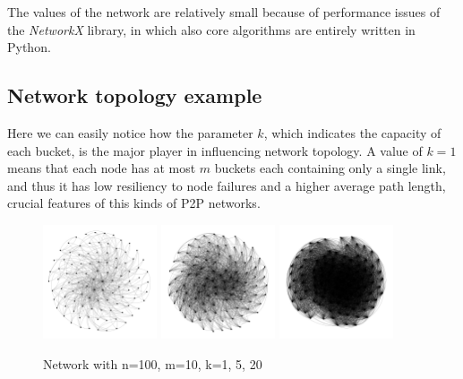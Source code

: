 \documentclass[12pt]{article}
\begin{document}
The values of the network are relatively small because of performance issues of the \textit{NetworkX} library, in which also core algorithms are entirely written in Python.

\subsection{Network topology example}

Here we can easily notice how the parameter $k$, which indicates the capacity of each bucket, is the major player in influencing network topology. A value of $k=1$ means that each node has at most $m$ buckets each containing only a single link, and thus it has low resiliency to node failures and a higher average path length, crucial features of this kinds of P2P networks.

\begin{figure}[H]
    \centering
    \includegraphics[width=0.3\textwidth]{assets/k1.png}
    \includegraphics[width=0.3\textwidth]{assets/k5.png} 
    \includegraphics[width=0.3\textwidth]{assets/k20.png}
    \caption{Network with n=100, m=10, k=1, 5, 20}
    \label{fig:graph_n10_m160_k1520_alpha3}
\end{figure}

\pagebreak
\end{document}

